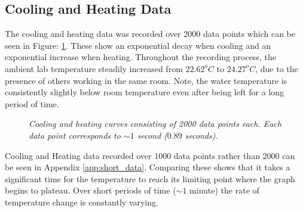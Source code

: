 \documentclass[10pt]{article}
\begin{document}
\subsection*{Cooling and Heating Data}
The cooling and heating data was recorded over 2000 data points which can be seen in Figure: \ref{fig:heat_and_cool_curve}. These show an exponential decay when cooling and an exponential increase when heating. Throughout the recording process, the ambient lab temperature steadily increased from $22.62^oC$ to $24.27^oC$, due to the presence of others working in the same room. Note, the water temperature is consistently slightly below room temperature even after being left for a long period of time.\\

\begin{figure}[h!]
    \centering
    \qquad
    \caption{\it{Cooling and heating curves consisting of 2000 data points each. Each data point corresponds to $\sim 1$ second ($0.89$ seconds). }}%
    \label{fig:heat_and_cool_curve}%
\end{figure}

Cooling and Heating data recorded over 1000 data points rather than 2000 can be seen in Appendix \ref{app:short_data}. Comparing these shows that it takes a significant time for the temperature to reach its limiting point where the graph begins to plateau. Over short periods of time ($\sim 1$ minute) the rate of temperature change is constantly varying.\\
\end{document}
